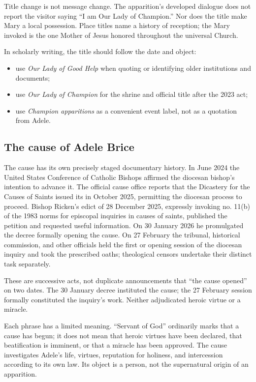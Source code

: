 Title change is not message change. The apparition's developed dialogue does not report the visitor saying “I am Our Lady of Champion.” Nor does the title make Mary a local possession. Place titles name a history of reception; the Mary invoked is the one Mother of Jesus honored throughout the universal Church.

In scholarly writing, the title should follow the date and object:

\begin{itemize}
  \item use \emph{Our Lady of Good Help} when quoting or identifying older institutions and documents;
  \item use \emph{Our Lady of Champion} for the shrine and official title after the 2023 act;
  \item use \emph{Champion apparitions} as a convenient event label, not as a quotation from Adele.
\end{itemize}

\subsection{The cause of Adele Brice}

The cause has its own precisely staged documentary history. In June 2024 the United States Conference of Catholic Bishops affirmed the diocesan bishop's intention to advance it. The official cause office reports that the Dicastery for the Causes of Saints issued its  in October 2025, permitting the diocesan process to proceed. Bishop Ricken's edict of 28 December 2025, expressly invoking no. 11(b) of the 1983 norms for episcopal inquiries in causes of saints, published the petition and requested useful information. On 30 January 2026 he promulgated the decree formally opening the cause. On 27 February the tribunal, historical commission, and other officials held the first or opening session of the diocesan inquiry and took the prescribed oaths; theological censors undertake their distinct task separately.

These are successive acts, not duplicate announcements that “the cause opened” on two dates. The 30 January decree instituted the cause; the 27 February session formally constituted the inquiry's work. Neither adjudicated heroic virtue or a miracle.

Each phrase has a limited meaning. “Servant of God” ordinarily marks that a cause has begun; it does not mean that heroic virtues have been declared, that beatification is imminent, or that a miracle has been approved. The cause investigates Adele's life, virtues, reputation for holiness, and intercession according to its own law. Its object is a person, not the supernatural origin of an apparition.

